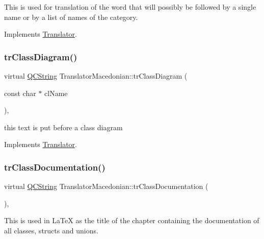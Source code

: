 This is used for translation of the word that will possibly be followed by a single name or by a list of names of the category. 

Implements \mbox{\hyperlink{class_translator}{Translator}}.

\mbox{\label{class_translator_macedonian_a34ba5cd696b1c122839281d4de77712f}} 
\subsubsection{\texorpdfstring{trClassDiagram()}{trClassDiagram()}}
{\footnotesize\ttfamily virtual \mbox{\hyperlink{class_q_c_string}{Q\+C\+String}} Translator\+Macedonian\+::tr\+Class\+Diagram (\begin{DoxyParamCaption}\item[{const char $\ast$}]{cl\+Name }\end{DoxyParamCaption})\hspace{0.3cm}{\ttfamily [inline]}, {\ttfamily [virtual]}}

this text is put before a class diagram 

Implements \mbox{\hyperlink{class_translator}{Translator}}.

\mbox{\label{class_translator_macedonian_abffb6c9e44876d5ec4a4bbb8b5461a77}} 
\subsubsection{\texorpdfstring{trClassDocumentation()}{trClassDocumentation()}}
{\footnotesize\ttfamily virtual \mbox{\hyperlink{class_q_c_string}{Q\+C\+String}} Translator\+Macedonian\+::tr\+Class\+Documentation (\begin{DoxyParamCaption}{ }\end{DoxyParamCaption})\hspace{0.3cm}{\ttfamily [inline]}, {\ttfamily [virtual]}}

This is used in La\+TeX as the title of the chapter containing the documentation of all classes, structs and unions. 

